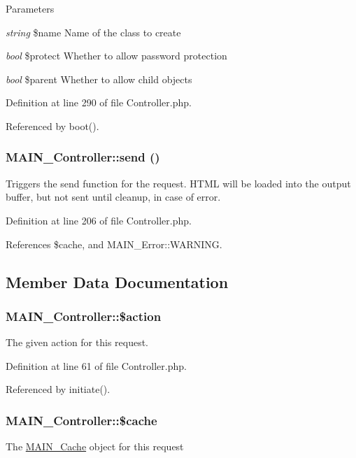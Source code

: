 \begin{DoxyParams}{Parameters}
\item[{\em string}]\$name Name of the class to create \item[{\em bool}]\$protect Whether to allow password protection \item[{\em bool}]\$parent Whether to allow child objects \end{DoxyParams}


Definition at line 290 of file Controller.php.

Referenced by boot().\hypertarget{classMAIN__Controller_a940555212e44afb717f9c11e9b6424d8}{
\subsubsection[{send}]{\setlength{\rightskip}{0pt plus 5cm}MAIN\_\-Controller::send ()}}
\label{d0/d6f/classMAIN__Controller_a940555212e44afb717f9c11e9b6424d8}
Triggers the send function for the request. HTML will be loaded into the output buffer, but not sent until cleanup, in case of error. 

Definition at line 206 of file Controller.php.

References \$cache, and MAIN\_\-Error::WARNING.

\subsection{Member Data Documentation}
\hypertarget{classMAIN__Controller_a586f25bf8bda47c77b6a66a5f2d0d68f}{
\subsubsection[{\$action}]{\setlength{\rightskip}{0pt plus 5cm}MAIN\_\-Controller::\$action}}
\label{d0/d6f/classMAIN__Controller_a586f25bf8bda47c77b6a66a5f2d0d68f}
The given action for this request. 

Definition at line 61 of file Controller.php.

Referenced by initiate().\hypertarget{classMAIN__Controller_ad9dbd5184b193cbea96bd88eadd88059}{
\subsubsection[{\$cache}]{\setlength{\rightskip}{0pt plus 5cm}MAIN\_\-Controller::\$cache}}
\label{d0/d6f/classMAIN__Controller_ad9dbd5184b193cbea96bd88eadd88059}
The \hyperlink{classMAIN__Cache}{MAIN\_\-Cache} object for this request 

